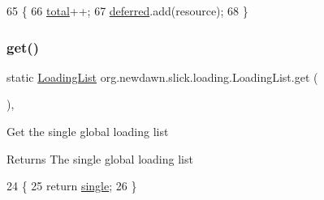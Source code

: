 \begin{DoxyCode}
65                                                \{
66         \mbox{\hyperlink{classorg_1_1newdawn_1_1slick_1_1loading_1_1_loading_list_a26a2808de2c1171ed883cc89831b0332}{total}}++;
67         \mbox{\hyperlink{classorg_1_1newdawn_1_1slick_1_1loading_1_1_loading_list_a5ec264187931448fbcf900ccf59bab72}{deferred}}.add(resource);
68     \}
\end{DoxyCode}
\mbox{\label{classorg_1_1newdawn_1_1slick_1_1loading_1_1_loading_list_a5c39c46ae4f8c0888997e91d46243484}} 
\subsubsection{\texorpdfstring{get()}{get()}}
{\footnotesize\ttfamily static \mbox{\hyperlink{classorg_1_1newdawn_1_1slick_1_1loading_1_1_loading_list}{Loading\+List}} org.\+newdawn.\+slick.\+loading.\+Loading\+List.\+get (\begin{DoxyParamCaption}{ }\end{DoxyParamCaption})\hspace{0.3cm}{\ttfamily [inline]}, {\ttfamily [static]}}

Get the single global loading list

\begin{DoxyReturn}{Returns}
The single global loading list 
\end{DoxyReturn}

\begin{DoxyCode}
24                                     \{
25         \textcolor{keywordflow}{return} \mbox{\hyperlink{classorg_1_1newdawn_1_1slick_1_1loading_1_1_loading_list_ae4a959a966e43388d21307e80e2ae329}{single}};
26     \}
\end{DoxyCode}
\mbox{\label{classorg_1_1newdawn_1_1slick_1_1loading_1_1_loading_list_a2bb33107be5c921db8e65ef94a6d51e0}} 

